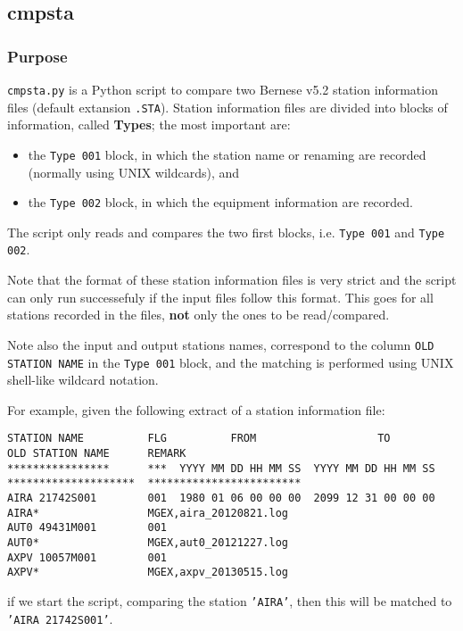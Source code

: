 \subsection{cmpsta}
\label{cmpsta}

\subsubsection{Purpose}
\texttt{cmpsta.py} is a Python script to compare two Bernese v5.2 station information
files (default extansion \texttt{.STA}). Station information files are divided into
blocks of information, called \textbf{Types}; the most important are:
\begin{itemize}
\item the \texttt{Type 001} block, in which the station name or renaming are recorded
(normally using UNIX wildcards), and
\item the \texttt{Type 002} block, in which the equipment information are recorded.
\end{itemize}
The script only reads and compares the two first blocks, i.e. \texttt{Type 001} and \texttt{Type 002}.


Note that the format of these station information files is very strict and the script
can only run successefuly if the input files follow this format. This goes for all
stations recorded in the files, \textbf{not} only the ones to be read/compared.


Note also the input and output stations names, correspond to the column \texttt{OLD STATION NAME}
in the \texttt{Type 001} block, and the matching is performed using UNIX shell-like
wildcard notation.

For example, given the following extract of a station information file:
\begin{Verbatim}[fontsize=\scriptsize]
STATION NAME          FLG          FROM                   TO         OLD STATION NAME      REMARK
****************      ***  YYYY MM DD HH MM SS  YYYY MM DD HH MM SS  ********************  ************************
AIRA 21742S001        001  1980 01 06 00 00 00  2099 12 31 00 00 00  AIRA*                 MGEX,aira_20120821.log
AUT0 49431M001        001                                            AUT0*                 MGEX,aut0_20121227.log
AXPV 10057M001        001                                            AXPV*                 MGEX,axpv_20130515.log
\end{Verbatim}
if we start the script, comparing the station \texttt{'AIRA'}, then this will be matched
to \texttt{'AIRA 21742S001'}.

